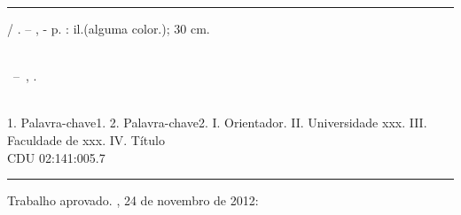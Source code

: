 \documentclass[a4paper, twoside, english, brazil, 12pt]{abntex2}
\begin{document}
\imprimircapa
\imprimirfolhaderosto*

\begin{fichacatalografica}
	\vspace*{15cm} %
	\hrule %
	\begin{center} %
		\begin{minipage}[c]{12.5cm} %
			\imprimirautor
			\hspace{0.5cm} \imprimirtitulo / \imprimirautor. --
			\imprimirlocal, \imprimirdata-
			\hspace{0.5cm} \pageref{LastPage} p. : il.(alguma color.); 30 cm.\\
			\hspace{0.5cm} \imprimirorientadorRotulo \imprimirorientador\\
			\hspace{0.5cm}
			\parbox[t]{\textwidth}{\imprimirtipotrabalho~--~\imprimirinstituicao,
				\imprimirdata.}\\
			\hspace{0.5cm}
			1. Palavra-chave1.
			2. Palavra-chave2.
			I. Orientador.
			II. Universidade xxx.
			III. Faculdade de xxx.
			IV. Título\\
			\hspace{8.75cm} CDU 02:141:005.7\\
		\end{minipage}
	\end{center}
	\hrule
\end{fichacatalografica}
\newpage

\begin{folhadeaprovacao}
	\begin{center}
		{\ABNTEXchapterfont\large\imprimirautor}
		\par
		\vspace*{\fill}
		{\ABNTEXchapterfont\bfseries\Large\imprimirtitulo}
		\par
		\vspace*{\fill}
		\par
		\hspace{.45\textwidth}
		\begin{minipage}{.5\textwidth}
			\imprimirpreambulo
		\end{minipage}%
		\vspace*{\fill}
	\end{center}
	Trabalho aprovado. \imprimirlocal, 24 de novembro de 2012:
	\begin{center}
		\vspace*{0.5cm}
		{\large\imprimirlocal}
		\par
		{\large\imprimirdata}
		\vspace*{1cm}
	\end{center}
\end{folhadeaprovacao}
\end{document}
